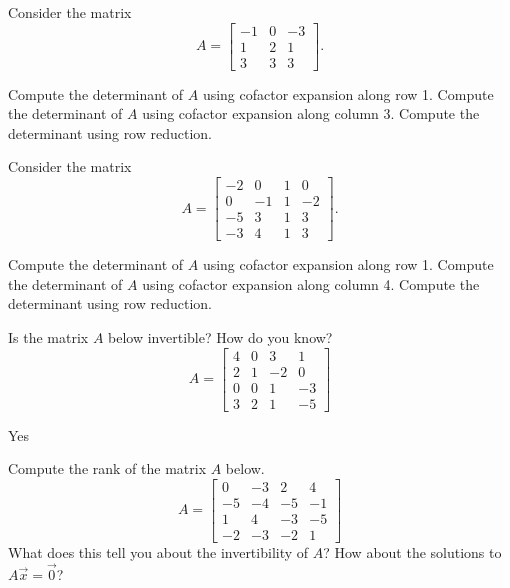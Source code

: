 \begin{exercise}\ansMark%
Consider the matrix
\begin{equation*}
A = \begin{bmatrix}
-1 & 0 & -3 \\ 1 & 2 & 1 \\ 3 & 3 & 3
\end{bmatrix}.
\end{equation*}
\begin{tasks}
\task Compute the determinant of $A$ using cofactor expansion along row 1.
\task Compute the determinant of $A$ using cofactor expansion along column 3.
\task Compute the determinant using row reduction.
\end{tasks}
\end{exercise}
%


\begin{exercise}\ansMark%
Consider the matrix
\begin{equation*}
A = \begin{bmatrix}
-2 & 0 & 1 & 0 \\ 0 & -1 & 1 & -2 \\ -5 &3 & 1 & 3 \\ -3 & 4 & 1 & 3
\end{bmatrix}.
\end{equation*}
\begin{tasks}
\task Compute the determinant of $A$ using cofactor expansion along row 1.
\task Compute the determinant of $A$ using cofactor expansion along column 4.
\task Compute the determinant using row reduction.
\end{tasks}
\end{exercise}
%



\begin{exercise}
Is the matrix $A$ below invertible? How do you know?
\[ A = \begin{bmatrix}4&0&3&1 \\ 2 &1&-2&0 \\ 0&0&1&-3 \\3 & 2 & 1 & -5 \end{bmatrix} \]
\end{exercise}
\comboSol{%
}
{%
Yes
}

\begin{exercise}\ansMark%
Compute the rank of the matrix $A$ below.
\[ A =  \begin{bmatrix} 0 & -3 & 2 & 4 \\ -5 & -4 &-5 & -1 \\ 1&4&-3 & -5\\ -2 & -3 &-2&1\end{bmatrix} \]
What does this tell you about the invertibility of $A$? How about the solutions to $A\vec{x} = \vec{0}$? 
\end{exercise}

